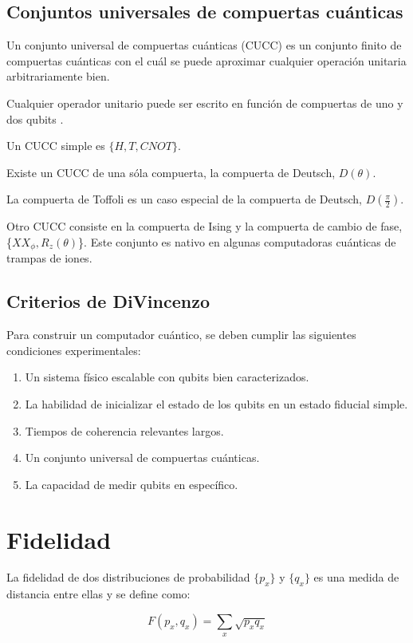 \subsection{Conjuntos universales de compuertas cuánticas}
Un conjunto universal de compuertas cuánticas (CUCC) es un conjunto finito de compuertas cuánticas con el cuál se puede aproximar cualquier operación unitaria arbitrariamente bien.

Cualquier operador unitario puede ser escrito en función de compuertas de uno y dos qubits \cite{barenco}.

Un CUCC simple es $\{H,T,\mathit{CNOT}\}$.

Existe un CUCC de una sóla compuerta, la compuerta de Deutsch, $D(\theta)$.

La compuerta de Toffoli es un caso especial de la compuerta de Deutsch, $D(\frac{\pi}{2})$.

Otro CUCC consiste en la compuerta de Ising y la compuerta de cambio de fase, \{$\mathit{XX}_\phi,R_z(\theta)$\}. Este conjunto es nativo en algunas computadoras cuánticas de trampas de iones.

\subsection{Criterios de DiVincenzo}
Para construir un computador cuántico, se deben cumplir las siguientes condiciones experimentales:

\begin{enumerate}
    \item Un sistema físico escalable con qubits bien caracterizados.
    \item La habilidad de inicializar el estado de los qubits en un estado fiducial simple.
    \item Tiempos de coherencia relevantes largos.
    \item Un conjunto universal de compuertas cuánticas.
    \item La capacidad de medir qubits en específico.
\end{enumerate}

\section{Fidelidad}

La fidelidad de dos distribuciones de probabilidad $\{p_x\}$ y $\{q_x\}$ es una medida de distancia entre ellas y se define como:

\begin{equation}
    F(p_x, q_x) = \sum\limits_x \sqrt{p_x q_x}
\end{equation}

